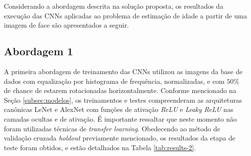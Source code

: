 
Considerando a abordagem descrita na solução proposta, os resultados da execução das CNNs aplicadas ao problema de estimação de idade a partir de uma imagem de face são apresentados a seguir.

%

\subsection{Abordagem 1}%
A primeira abordagem de treinamento das CNNs utilizou as imagens da base de dados com equalização por histograma de frequência, normalizadas, e com $50\%$ de chance de estarem rotacionadas horizontalmente. Conforme mencionado na Seção \ref{subsec:modelos}, os treinamentos e testes compreenderam as arquiteturas canônicas LeNet e AlexNet com funções de ativação \emph{ReLU} e \emph{Leaky ReLU} nas camadas ocultas e de ativação. É importante ressaltar que neste momento não foram utilizadas técnicas de \emph{transfer learning}. Obedecendo ao método de validação cruzada \emph{holdout} previamente mencionado, os resultados da etapa de teste foram obtidos, e estão detalhados na Tabela \ref{tab:results-2}.

